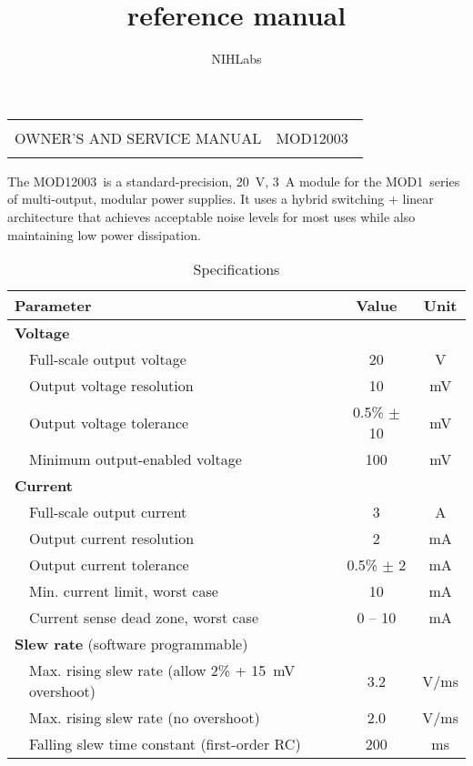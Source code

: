 \documentclass[letterpaper,twocolumn,10pt,openany,oneside,final,fleqn]{memoir}
\title{\Model reference manual}
\author{NIHLabs}
\newcommand{\Model}{MOD12003\ }
\newcommand{\Series}{MOD1\ }
\begin{document}
\frontmatter

\onecolumn
\begin{titlingpage}
\begin{tabularx}{\textwidth}{Xr}
\hline
\\
{\LARGE OWNER'S AND SERVICE MANUAL} &
\Model \\
\\
\hline
\end{tabularx}
\vfill
\begin{center}
    The \Model is a standard-precision, \SI{20}{V}, \SI{3}{A} module for the
    \Series series of multi-output, modular power supplies. It uses a hybrid
    switching + linear architecture that achieves acceptable noise levels for
    most uses while also maintaining low power dissipation.
\end{center}
\vfill
\begin{table}[h]
\centering
\caption{Specifications}
\begin{tabular}{p{2mm}lcc}
    \toprule
    \multicolumn{2}{l}{\textbf{Parameter}} & \textbf{Value} & \textbf{Unit} \\ \midrule
    \multicolumn{2}{l}{\textbf{Voltage}} & & \\ \midrule
    & Full-scale output voltage & 20 & V \\
    & Output voltage resolution & 10 & mV \\
    & Output voltage tolerance  & 0.5\% $\pm$ 10 & mV \\
    & Minimum output-enabled voltage & 100 & mV \\
    \midrule
    \multicolumn{2}{l}{\textbf{Current}} & & \\ \midrule
    & Full-scale output current & 3 & A  \\
    & Output current resolution & 2 & mA \\
    & Output current tolerance  & 0.5\% $\pm$ 2 & mA \\
    & Min. current limit, worst case & 10 & mA \\
    & Current sense dead zone, worst case   & 0 -- 10 & mA \\
    \midrule
    \multicolumn{2}{l}{\textbf{Slew rate} (software programmable)} & & \\ \midrule
    & Max. rising slew rate (allow 2\% + \SI{15}{mV} overshoot) & 3.2 & V/ms \\
    & Max. rising slew rate (no overshoot) & 2.0 & V/ms \\
    & Falling slew time constant (first-order RC) & 200 & ms \\

\end{tabular}
\end{table}
\end{titlingpage}
\end{document}
